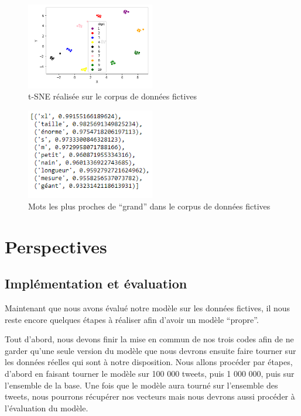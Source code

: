 \documentclass[11pt,french,french]{article}
\begin{document}
\begin{figure}
\centering
\includegraphics[width=0.50000\textwidth]{TSNE_fictif.png}
\caption{t-SNE réalisée sur le corpus de données fictives}
\end{figure}

\begin{figure}
\centering
\includegraphics[width=0.50000\textwidth]{cos_fictif.png}
\caption{Mots les plus proches de ``grand'' dans le corpus de données
fictives}
\end{figure}

\section{Perspectives}\label{perspectives}

\subsection{Implémentation et
évaluation}\label{impluxe9mentation-et-uxe9valuation}

Maintenant que nous avons évalué notre modèle sur les données fictives,
il nous reste encore quelques étapes à réaliser afin d'avoir un modèle
``propre''.

Tout d'abord, nous devons finir la mise en commun de nos trois codes
afin de ne garder qu'une seule version du modèle que nous devrons
ensuite faire tourner sur les données réelles qui sont à notre
disposition. Nous allons procéder par étapes, d'abord en faisant tourner
le modèle sur 100 000 tweets, puis 1 000 000, puis sur l'ensemble de la
base. Une fois que le modèle aura tourné sur l'ensemble des tweets, nous
pourrons récupérer nos vecteurs mais nous devrons aussi procéder à
l'évaluation du modèle.
\end{document}
